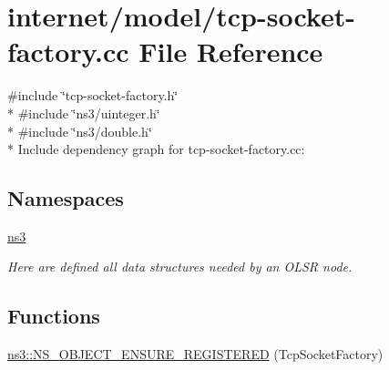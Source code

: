 \hypertarget{tcp-socket-factory_8cc}{}\section{internet/model/tcp-\/socket-\/factory.cc File Reference}
\label{tcp-socket-factory_8cc}
{\ttfamily \#include \char`\"{}tcp-\/socket-\/factory.\+h\char`\"{}}\\*
{\ttfamily \#include \char`\"{}ns3/uinteger.\+h\char`\"{}}\\*
{\ttfamily \#include \char`\"{}ns3/double.\+h\char`\"{}}\\*
Include dependency graph for tcp-\/socket-\/factory.cc\+:
\subsection*{Namespaces}
\begin{DoxyCompactItemize}
\item 
 \hyperlink{namespacens3}{ns3}
\begin{DoxyCompactList}\small\item\em Here are defined all data structures needed by an O\+L\+SR node. \end{DoxyCompactList}\end{DoxyCompactItemize}
\subsection*{Functions}
\begin{DoxyCompactItemize}
\item 
\hyperlink{namespacens3_ac28edb1d54e2beccf883b61d5bfd5e77}{ns3\+::\+N\+S\+\_\+\+O\+B\+J\+E\+C\+T\+\_\+\+E\+N\+S\+U\+R\+E\+\_\+\+R\+E\+G\+I\+S\+T\+E\+R\+ED} (Tcp\+Socket\+Factory)
\end{DoxyCompactItemize}
